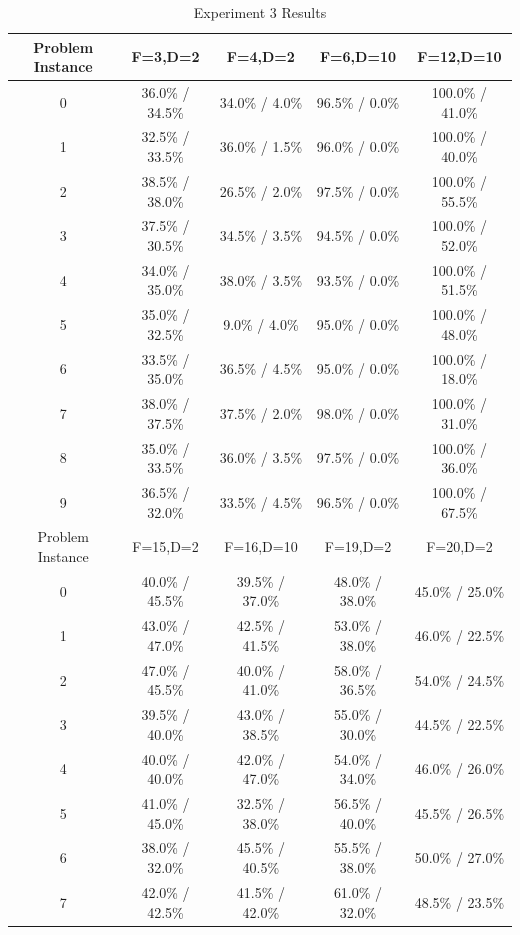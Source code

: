 \documentclass[times,12pt,titlepage]{mstogs}
\begin{document}
\begin{ThesisBody}
\begin{table}
\centering
  \caption{Experiment 3 Results}
  \label{tab:experiment3Results}
  \begin{tabular}{c|c|c|c|c}
    \toprule
	Problem Instance & F=3,D=2 & F=4,D=2 & F=6,D=10 & F=12,D=10\\
	\hline
	0 & 36.0\% / 34.5\% & 34.0\% / 4.0\% & 96.5\% / 0.0\% & 100.0\% / 41.0\%\\
	\hline
	1 & 32.5\% / 33.5\% & 36.0\% / 1.5\% & 96.0\% / 0.0\% & 100.0\% / 40.0\%\\
	\hline
	2 & 38.5\% / 38.0\% & 26.5\% / 2.0\% & 97.5\% / 0.0\% & 100.0\% / 55.5\%\\
	\hline
	3 & 37.5\% / 30.5\% & 34.5\% / 3.5\% & 94.5\% / 0.0\% & 100.0\% / 52.0\%\\
	\hline
	4 & 34.0\% / 35.0\% & 38.0\% / 3.5\% & 93.5\% / 0.0\% & 100.0\% / 51.5\%\\
	\hline
	5 & 35.0\% / 32.5\% & 9.0\% / 4.0\% & 95.0\% / 0.0\% & 100.0\% / 48.0\%\\
	\hline
	6 & 33.5\% / 35.0\% & 36.5\% / 4.5\% & 95.0\% / 0.0\% & 100.0\% / 18.0\%\\
	\hline
	7 & 38.0\% / 37.5\% & 37.5\% / 2.0\% & 98.0\% / 0.0\% & 100.0\% / 31.0\%\\
	\hline
	8 & 35.0\% / 33.5\% & 36.0\% / 3.5\% & 97.5\% / 0.0\% & 100.0\% / 36.0\%\\
	\hline
	9 & 36.5\% / 32.0\% & 33.5\% / 4.5\% & 96.5\% / 0.0\% & 100.0\% / 67.5\%\\
	\hline
	\hline
	Problem Instance & F=15,D=2 & F=16,D=10 & F=19,D=2 & F=20,D=2\\
	\hline
	0 & 40.0\% / 45.5\% & 39.5\% / 37.0\% & 48.0\% / 38.0\% & 45.0\% / 25.0\%\\
	\hline
	1 & 43.0\% / 47.0\% & 42.5\% / 41.5\% & 53.0\% / 38.0\% & 46.0\% / 22.5\%\\
	\hline
	2 & 47.0\% / 45.5\% & 40.0\% / 41.0\% & 58.0\% / 36.5\% & 54.0\% / 24.5\%\\
	\hline
	3 & 39.5\% / 40.0\% & 43.0\% / 38.5\% & 55.0\% / 30.0\% & 44.5\% / 22.5\%\\
	\hline
	4 & 40.0\% / 40.0\% & 42.0\% / 47.0\% & 54.0\% / 34.0\% & 46.0\% / 26.0\%\\
	\hline
	5 & 41.0\% / 45.0\% & 32.5\% / 38.0\% & 56.5\% / 40.0\% & 45.5\% / 26.5\%\\
	\hline
	6 & 38.0\% / 32.0\% & 45.5\% / 40.5\% & 55.5\% / 38.0\% & 50.0\% / 27.0\%\\
	\hline
	7 & 42.0\% / 42.5\% & 41.5\% / 42.0\% & 61.0\% / 32.0\% & 48.5\% / 23.5\%\\

\end{tabular}
\end{table}
\end{ThesisBody}
\end{document}
